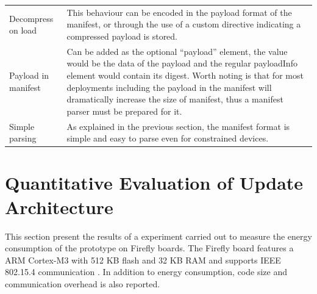 \documentclass[0-thesis.tex]{subfiles}
\begin{document}
\begin{longtable}[]{@{}ll@{}}
\begin{minipage}[t]{0.41\columnwidth}
    Decompress on load\strut
    \end{minipage} & \begin{minipage}[t]{0.53\columnwidth}\raggedright\strut
    This behaviour can be encoded in the payload format of the manifest, or
    through the use of a custom directive indicating a compressed payload is
    stored.\strut
    \end{minipage}\tabularnewline
    \begin{minipage}[t]{0.41\columnwidth}\raggedright\strut
    Payload in manifest\strut
    \end{minipage} & \begin{minipage}[t]{0.53\columnwidth}\raggedright\strut
    Can be added as the optional ``payload'' element, the value would be the
    data of the payload and the regular payloadInfo element would contain
    its digest. Worth noting is that for most deployments including the
    payload in the manifest will dramatically increase the size of manifest,
    thus a manifest parser must be prepared for it.\strut
    \end{minipage}\tabularnewline
    \begin{minipage}[t]{0.41\columnwidth}\raggedright\strut
    Simple parsing\strut
    \end{minipage} & \begin{minipage}[t]{0.53\columnwidth}\raggedright\strut
    As explained in the previous section, the manifest format is simple and
    easy to parse even for constrained devices.\strut
    \end{minipage}\tabularnewline
    \bottomrule
\end{longtable}


\section{Quantitative Evaluation of Update Architecture}
\label{sec:quant-evaluation}
This section present the results of a experiment carried out to measure the energy
consumption of the prototype on Firefly boards. The Firefly board features a ARM Cortex-M3
with 512 KB flash and 32 KB RAM and supports IEEE 802.15.4 communication
\parencite{firefly-datasheet}. In addition to energy consumption, code size and
communication overhead is also reported. 
\end{document}
